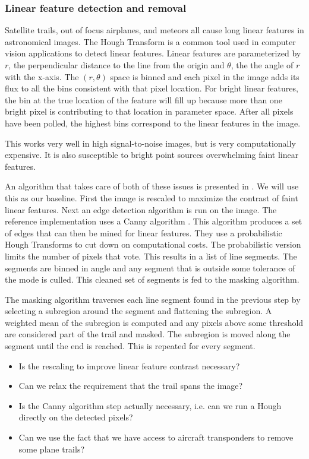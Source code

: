 \subsubsection{Linear feature detection and removal}

Satellite trails, out of focus airplanes, and meteors all cause long linear features in astronomical images.  The Hough Transform \citep{c1962method} is a common tool used in computer vision applications to detect linear features.  Linear features are parameterized by $r$, the perpendicular distance to the line from the origin and $\theta$, the the angle of $r$ with the x-axis.  The $(r, \theta)$ space is binned and each pixel in the image adds its flux to all the bins consistent with that pixel location.  For bright linear features, the bin at the true location of the feature will fill up because more than one bright pixel is contributing to that location in parameter space.  After all pixels have been polled, the highest bins correspond to the linear features in the image.

This works very well in high signal-to-noise images, but is very computationally expensive.  It is also susceptible to bright point sources overwhelming faint linear features.

An algorithm that takes care of both of these issues is presented in \cite{2016acs..rept....1B}.  We will use this
as our baseline.  First the image is rescaled to maximize the contrast of faint linear features.  Next an edge detection algorithm is run on the image.  The reference implementation uses a Canny algorithm \citep{Canny:1986:CAE:11274.11275}.  This algorithm produces a set of edges that can then be mined for linear features.  They use a probabilistic Hough Transforms \citep{Galamhos:1999:IEEE:786993} to cut down on computational costs.  The probabilistic version limits the number of pixels that vote.  This results in a list of line segments.  The segments are binned in angle and any segment that is outside some tolerance of the mode is culled.  This cleaned set of segments is fed to the masking algorithm.

The masking algorithm traverses each line segment found in the previous step by selecting a subregion around the segment and flattening the subregion.  A weighted mean of the subregion is computed and any pixels above some threshold are considered part of the trail and masked.  The subregion is moved along the segment until the end is reached.  This is repeated for every segment.

\begin{note}
\begin{itemize}
\item Is the rescaling to improve linear feature contrast necessary?
\item Can we relax the requirement that the trail spans the image?
\item Is the Canny algorithm step actually necessary, i.e. can we run a Hough directly on the detected pixels?
\item Can we use the fact that we have access to aircraft transponders to remove some plane trails?
\end{itemize}
\end{note}

